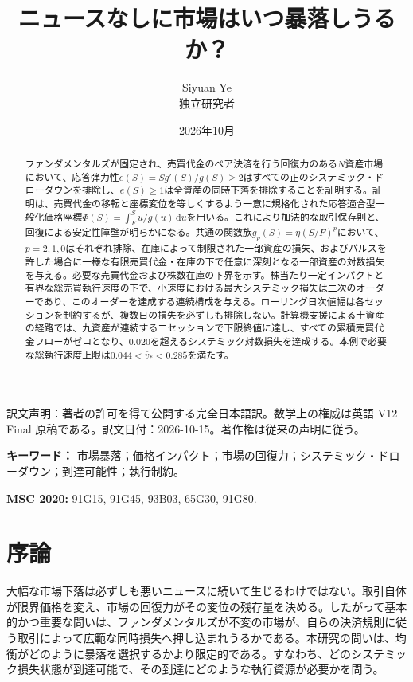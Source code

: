 \documentclass[11pt]{article}
\title{\textbf{ニュースなしに市場はいつ暴落しうるか？}}
\author{Siyuan Ye\\{\small 独立研究者}}
\date{2026年10月}
\numberwithin{equation}{section}
\theoremstyle{definition}
\theoremstyle{remark}
\begin{document}
\maketitle
{\small 訳文声明：著者の許可を得て公開する完全日本語訳。数学上の権威は英語 V12 Final 原稿である。訳文日付：2026-10-15。著作権は従来の声明に従う。}\par
\vspace{-0.95em}
\begin{abstract}\noindent
ファンダメンタルズが固定され、売買代金のペア決済を行う回復力のある$N$資産市場において、応答弾力性$e(S)=Sg'(S)/g(S)\ge2$はすべての正のシステミック・ドローダウンを排除し、$e(S)\ge1$は全資産の同時下落を排除することを証明する。証明は、売買代金の移転と座標変位を等しくするよう一意に規格化された応答適合型一般化価格座標$\Phi(S)=\int_F^S u/g(u)\,\mathrm{d}u$を用いる。これにより加法的な取引保存則と、回復による安定性障壁が明らかになる。共通の関数族$g_p(S)=\eta(S/F)^p$において、$p=2,1,0$はそれぞれ排除、在庫によって制限された一部資産の損失、およびパルスを許した場合に一様な有限売買代金・在庫の下で任意に深刻となる一部資産の対数損失を与える。必要な売買代金および株数在庫の下界を示す。株当たり一定インパクトと有界な総売買執行速度の下で、小速度における最大システミック損失は二次のオーダーであり、このオーダーを達成する連続構成を与える。ローリング日次値幅は各セッションを制約するが、複数日の損失を必ずしも排除しない。計算機支援による十資産の経路では、九資産が連続する二セッションで下限終値に達し、すべての累積売買代金フローがゼロとなり、$0.020$を超えるシステミック対数損失を達成する。本例で必要な総執行速度上限は$0.044<\bar v_*<0.285$を満たす。
\end{abstract}
\noindent\textbf{キーワード：} 市場暴落；価格インパクト；市場の回復力；システミック・ドローダウン；到達可能性；執行制約。\par
\noindent\textbf{MSC 2020:} 91G15, 91G45, 93B03, 65G30, 91G80.

\section{序論}\label{sec:intro}
大幅な市場下落は必ずしも悪いニュースに続いて生じるわけではない。取引自体が限界価格を変え、市場の回復力がその変位の残存量を決める。したがって基本的かつ重要な問いは、ファンダメンタルズが不変の市場が、自らの決済規則に従う取引によって広範な同時損失へ押し込まれうるかである。本研究の問いは、均衡がどのように暴落を選択するかより限定的である。すなわち、どのシステミック損失状態が到達可能で、その到達にどのような執行資源が必要かを問う。
\end{document}

